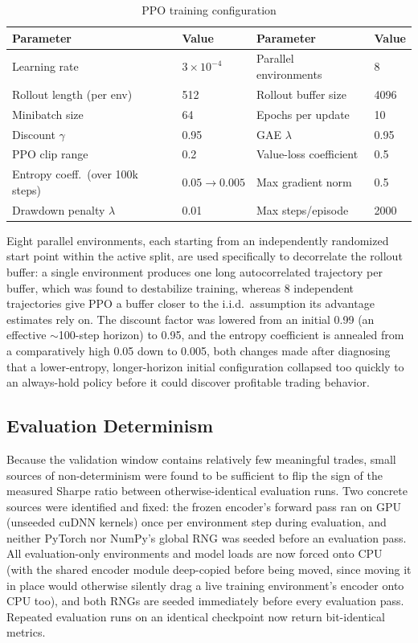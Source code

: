 \begin{table}[H]
\centering
\small
\caption{PPO training configuration}
\label{tab:ppo-hyperparams}
\begin{tabular}{|l|l||l|l|}
\hline
\textbf{Parameter} & \textbf{Value} & \textbf{Parameter} & \textbf{Value} \\
\hline
Learning rate & $3\times10^{-4}$ & Parallel environments & 8 \\
\hline
Rollout length (per env) & 512 & Rollout buffer size & 4096 \\
\hline
Minibatch size & 64 & Epochs per update & 10 \\
\hline
Discount $\gamma$ & 0.95 & GAE $\lambda$ & 0.95 \\
\hline
PPO clip range & 0.2 & Value-loss coefficient & 0.5 \\
\hline
Entropy coeff.\ (over 100k steps) & $0.05 \to 0.005$ & Max gradient norm & 0.5 \\
\hline
Drawdown penalty $\lambda$ & 0.01 & Max steps/episode & 2000 \\
\hline
\end{tabular}
\normalsize
\end{table}

Eight parallel environments, each starting from an independently randomized start point within the active split, are used specifically to decorrelate the rollout buffer: a single environment produces one long autocorrelated trajectory per buffer, which was found to destabilize training, whereas 8 independent trajectories give PPO a buffer closer to the i.i.d.\ assumption its advantage estimates rely on. The discount factor was lowered from an initial 0.99 (an effective $\sim$100-step horizon) to 0.95, and the entropy coefficient is annealed from a comparatively high 0.05 down to 0.005, both changes made after diagnosing that a lower-entropy, longer-horizon initial configuration collapsed too quickly to an always-hold policy before it could discover profitable trading behavior.

\subsection{Evaluation Determinism}
\label{subsec:rl-determinism}

Because the validation window contains relatively few meaningful trades, small sources of non-determinism were found to be sufficient to flip the sign of the measured Sharpe ratio between otherwise-identical evaluation runs. Two concrete sources were identified and fixed: the frozen encoder's forward pass ran on GPU (unseeded cuDNN kernels) once per environment step during evaluation, and neither PyTorch nor NumPy's global RNG was seeded before an evaluation pass. All evaluation-only environments and model loads are now forced onto CPU (with the shared encoder module deep-copied before being moved, since moving it in place would otherwise silently drag a live training environment's encoder onto CPU too), and both RNGs are seeded immediately before every evaluation pass. Repeated evaluation runs on an identical checkpoint now return bit-identical metrics.

